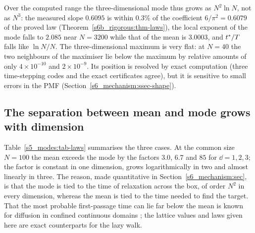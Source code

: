 Over the computed range the three-dimensional mode thus grows as $N^{2}\ln N$, not as $N^{3}$: the measured slope
$0.6095$ is within $0.3\%$ of the coefficient $6/\pi^{2}=0.6079$ of the proved law (Theorem~\ref{s6b_rigorous:thm-laws}),
the local exponent of the mode falls to $2.085$ near $N=3200$ while that of the mean is $3.0003$, and $t^{*}/T$ falls
like $\ln N/N$. The three-dimensional maximum is very flat: at $N=40$ the two neighbours of the maximiser lie below the
maximum by relative amounts of only $4\times10^{-10}$ and $2\times10^{-9}$. Its position is resolved by exact
computation (three time-stepping codes and the exact certificates agree), but it is sensitive to small errors in the
PMF (Section~\ref{s6_mechanism:ssec-shape}).

\subsection{The separation between mean and mode grows with dimension}\label{s5_modes:ssec-summary}

Table~\ref{s5_modes:tab-laws} summarises the three cases. At the common size $N=100$ the mean exceeds the mode by the
factors $3.0$, $6.7$ and $85$ for $\dd=1,2,3$; the factor is constant in one dimension, grows logarithmically in two
and almost linearly in three.
The reason, made quantitative in Section~\ref{s6_mechanism:sec}, is that the mode is tied to the time of relaxation
across the box, of order $N^{2}$ in every dimension, whereas the mean is tied to the time needed to find the target.
That the most probable first-passage time can lie far below the mean is known for diffusion in confined continuous
domains \citep{GodecMetzler2016,Grebenkov2018}; the lattice values and laws given here are exact counterparts for the
lazy walk.

